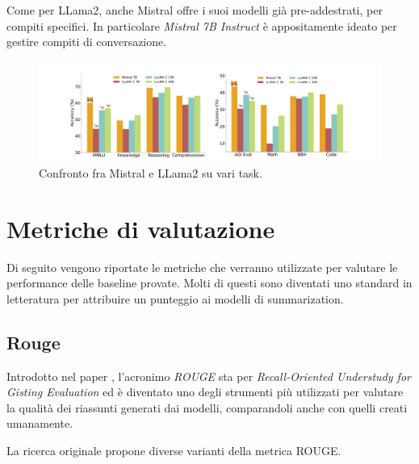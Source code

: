 \documentclass[12pt,a4paper,twoside,openright]{book}
\begin{document}
Come per LLama2, anche Mistral offre i suoi modelli già pre-addestrati, per compiti specifici. In particolare \emph{Mistral 7B Instruct} è appositamente ideato per gestire compiti di conversazione.

\begin{figure}
    \centering
    \includegraphics[width=\linewidth]{images/mistral-comparison.png}
    \caption{Confronto fra Mistral e LLama2 su vari task.}
    \label{fig:mistral-vs-lama}
\end{figure}


\section{Metriche di valutazione}
Di seguito vengono riportate le metriche che verranno utilizzate per valutare le performance delle baseline provate. Molti di questi sono diventati uno standard in letteratura per attribuire un punteggio ai modelli di summarization. 

\subsection{Rouge}
Introdotto nel paper \cite{lin-2004-rouge}, l'acronimo \emph{ROUGE} sta per \emph{Recall-Oriented Understudy for Gisting Evaluation} ed è diventato uno degli strumenti più utilizzati per valutare la qualità dei riassunti generati dai modelli, comparandoli anche con quelli creati umanamente.

La ricerca originale propone diverse varianti della metrica ROUGE.
\end{document}
